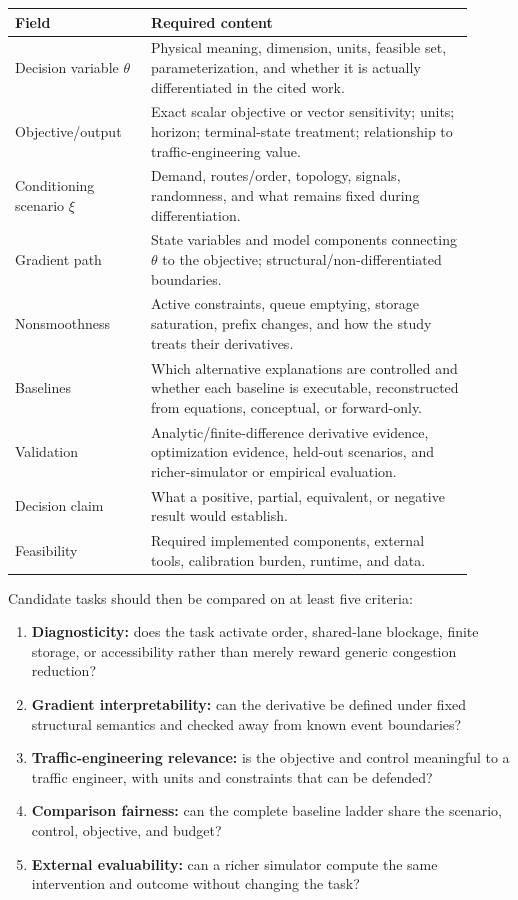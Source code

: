 \documentclass[11pt,a4paper]{article}
\begin{document}
\begin{longtable}{p{0.27\linewidth}p{0.64\linewidth}}
\toprule
\textbf{Field} & \textbf{Required content}\\
\midrule
Decision variable $\theta$ & Physical meaning, dimension, units, feasible set, parameterization, and whether it is actually differentiated in the cited work.\\
Objective/output & Exact scalar objective or vector sensitivity; units; horizon; terminal-state treatment; relationship to traffic-engineering value.\\
Conditioning scenario $\xi$ & Demand, routes/order, topology, signals, randomness, and what remains fixed during differentiation.\\
Gradient path & State variables and model components connecting $\theta$ to the objective; structural/non-differentiated boundaries.\\
Nonsmoothness & Active constraints, queue emptying, storage saturation, prefix changes, and how the study treats their derivatives.\\
Baselines & Which alternative explanations are controlled and whether each baseline is executable, reconstructed from equations, conceptual, or forward-only.\\
Validation & Analytic/finite-difference derivative evidence, optimization evidence, held-out scenarios, and richer-simulator or empirical evaluation.\\
Decision claim & What a positive, partial, equivalent, or negative result would establish.\\
Feasibility & Required implemented components, external tools, calibration burden, runtime, and data.\\
\bottomrule
\end{longtable}

Candidate tasks should then be compared on at least five criteria:

\begin{enumerate}
  \item \textbf{Diagnosticity:} does the task activate order, shared-lane blockage, finite storage, or accessibility rather than merely reward generic congestion reduction?
  \item \textbf{Gradient interpretability:} can the derivative be defined under fixed structural semantics and checked away from known event boundaries?
  \item \textbf{Traffic-engineering relevance:} is the objective and control meaningful to a traffic engineer, with units and constraints that can be defended?
  \item \textbf{Comparison fairness:} can the complete baseline ladder share the scenario, control, objective, and budget?
  \item \textbf{External evaluability:} can a richer simulator compute the same intervention and outcome without changing the task?
\end{enumerate}
\end{document}

